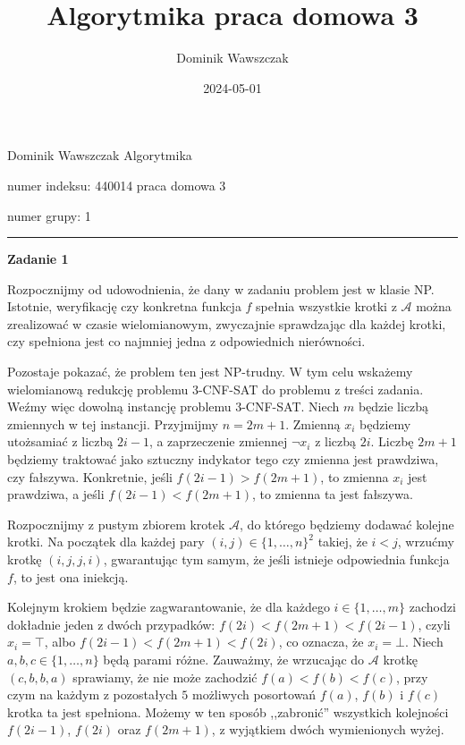 \documentclass[12pt]{article}
\title{Algorytmika praca domowa 3}
\author{Dominik Wawszczak}
\date{2024-05-01}
\begin{document}
	\setlength{\parindent}{0 cm}
	
	Dominik Wawszczak \hfill Algorytmika
	
	numer indeksu: 440014 \hfill praca domowa 3
	
	numer grupy: 1
	
	\bigskip
	\hrule
	\bigskip
	
	\textbf{Zadanie 1}
	
	\medskip
	
	Rozpocznijmy od udowodnienia, że dany w zadaniu problem jest w klasie NP.
	Istotnie, weryfikację czy konkretna funkcja \(f\) spełnia wszystkie krotki
	z \(\mathcal{A}\) można zrealizować w czasie wielomianowym, zwyczajnie
	sprawdzając dla każdej krotki, czy spełniona jest co najmniej jedna z
	odpowiednich nierówności.
	
	\medskip
	
	Pozostaje pokazać, że problem ten jest NP-trudny. W tym celu wskażemy
	wielomianową redukcję problemu 3-CNF-SAT do problemu z treści zadania.
	Weźmy więc dowolną instancję problemu 3-CNF-SAT. Niech \(m\) będzie liczbą
	zmiennych w tej instancji. Przyjmijmy \(n = 2m + 1\). Zmienną \(x_{i}\)
	będziemy utożsamiać z liczbą \(2i - 1\), a zaprzeczenie zmiennej \(\neg
	x_{i}\) z liczbą \(2i\). Liczbę \(2m + 1\) będziemy traktować jako sztuczny
	indykator tego czy zmienna jest prawdziwa, czy fałszywa. Konkretnie, jeśli
	\(f(2i - 1) > f(2m + 1)\), to zmienna \(x_{i}\) jest prawdziwa, a jeśli
	\(f(2i - 1) < f(2m + 1)\), to zmienna ta jest fałszywa.
	
	\medskip
	
	Rozpocznijmy z pustym zbiorem krotek \(\mathcal{A}\), do którego będziemy
	dodawać kolejne krotki. Na początek dla każdej pary \((i, j) \in \{1,
	\ldots, n\}^{2}\) takiej, że \(i < j\), wrzućmy krotkę \((i, j, j, i)\),
	gwarantując tym samym, że jeśli istnieje odpowiednia funkcja \(f\), to jest
	ona iniekcją.
	
	\medskip
	
	Kolejnym krokiem będzie zagwarantowanie, że dla każdego \(i \in \{1, \ldots,
	m\}\) zachodzi dokładnie jeden z dwóch przypadków: \(f(2i) < f(2m + 1) <
	f(2i - 1)\), czyli \(x_{i} = \top\), albo \(f(2i - 1) < f(2m + 1) < f(2i)\),
	co oznacza, że \(x_{i} = \bot\). Niech \(a, b, c \in \{1, \ldots, n\}\) będą
	parami różne. Zauważmy, że wrzucając do \(\mathcal{A}\) krotkę \((c, b, b,
	a)\) sprawiamy, że nie może zachodzić \(f(a) < f(b) < f(c)\), przy czym na
	każdym z pozostałych \(5\) możliwych posortowań \(f(a)\), \(f(b)\) i
	\(f(c)\) krotka ta jest spełniona. Możemy w ten sposób ,,zabronić''
	wszystkich kolejności  \(f(2i - 1)\), \(f(2i)\) oraz \(f(2m + 1)\), z
	wyjątkiem dwóch wymienionych wyżej.
	
\end{document}

